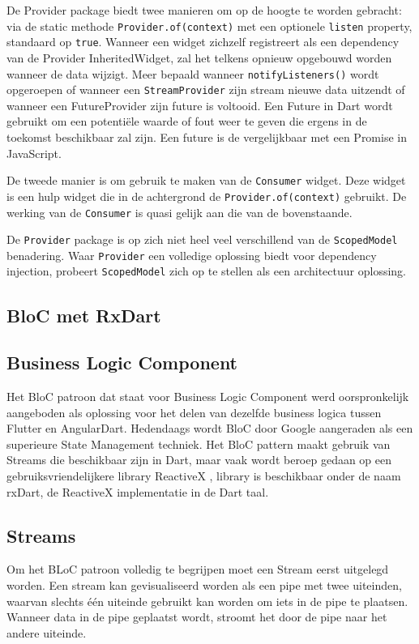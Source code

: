 De Provider package biedt twee manieren om op de hoogte te worden gebracht: via de static methode \verb|Provider.of(context)| met een optionele \verb|listen| property, standaard op \verb|true|.
Wanneer een widget zichzelf registreert als een dependency van de Provider InheritedWidget, zal het telkens opnieuw opgebouwd worden wanneer de data wijzigt. Meer bepaald wanneer \verb|notifyListeners()| wordt opgeroepen of wanneer een \verb|StreamProvider| zijn stream nieuwe data uitzendt of wanneer een FutureProvider zijn future is voltooid. Een Future in Dart wordt gebruikt om een potentiële waarde of fout weer te geven die ergens in de toekomst beschikbaar zal zijn. Een future is de vergelijkbaar met een Promise in JavaScript.

De tweede manier is om gebruik te maken van de \verb|Consumer| widget. Deze widget is een hulp widget die in de achtergrond de \verb|Provider.of(context)| gebruikt. De werking van de \verb|Consumer| is quasi gelijk aan die van de bovenstaande. 

De \verb|Provider| package is op zich niet heel veel verschillend van de \verb|ScopedModel| benadering. Waar \verb|Provider| een volledige oplossing biedt voor dependency injection, probeert \verb|ScopedModel| zich op te stellen als een architectuur oplossing.

\subsection{BloC met RxDart}
\subsection*{Business Logic Component}
Het BloC patroon dat staat voor Business Logic Component werd oorspronkelijk aangeboden als oplossing voor het delen van dezelfde business logica tussen Flutter en AngularDart. Hedendaags wordt BloC door Google aangeraden als een superieure State Management techniek. Het BloC pattern maakt gebruik van Streams die beschikbaar zijn in Dart, maar vaak wordt beroep gedaan op een gebruiksvriendelijkere library ReactiveX , library is beschikbaar onder de naam rxDart, de ReactiveX implementatie in de Dart taal.

\subsection*{Streams}
Om het BLoC patroon volledig te begrijpen moet een Stream eerst uitgelegd worden.
Een stream kan gevisualiseerd worden als een pipe met twee uiteinden, waarvan slechts
één uiteinde gebruikt kan worden om iets in de pipe te plaatsen. Wanneer data in de pipe
geplaatst wordt, stroomt het door de pipe naar het andere uiteinde. \autocite{Boelens2018}

